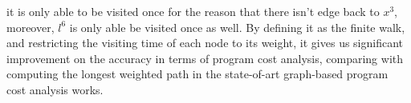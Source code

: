 it is only able to be visited once for the reason that there isn't edge back to $x^3$,
moreover, $l^6$ is only able be visited once as well.
By defining it as the finite walk, and restricting the visiting time of each node to its weight, 
it gives us significant improvement on the accuracy in terms of program cost analysis, comparing with computing the longest weighted path in the state-of-art graph-based program cost analysis works.




